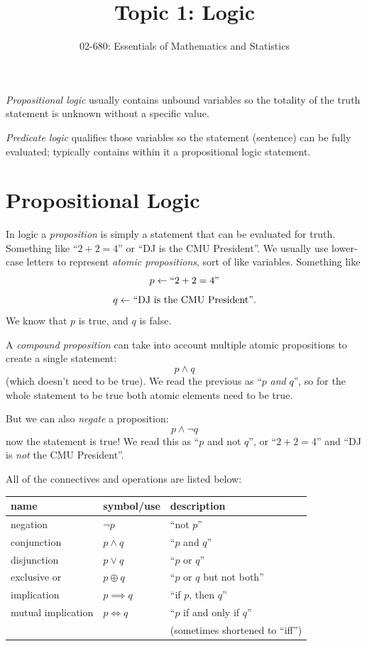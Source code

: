 


\title{Topic 1:  Logic}
\author{02-680: Essentials of Mathematics and Statistics}


\maketitle

\emph{Propositional logic} usually contains unbound variables so the totality of the truth statement is unknown without a specific value. 

\emph{Predicate logic} qualifies those variables so the statement (sentence) can be fully evaluated; typically contains within it a propositional logic statement. 

\section{Propositional Logic}
In logic a \emph{proposition} is simply a statement that can be evaluated for truth. 
Something like ``$2+2=4$'' or ``DJ is the CMU President''. 
We usually use lower-case letters to represent \emph{atomic propositions}, sort of like variables. 
Something like 
\[ p \leftarrow \textnormal{``}2+2=4\textnormal{''}\]
\[ q \leftarrow \textnormal{``DJ is the CMU President''}.\]
We know that $p$ is true, and $q$ is false. 


A \emph{compound proposition} can take into account multiple atomic propositions to create a single statement: 
\[ p \wedge q \]
(which doesn't need to be true). 
We read the previous as ``$p$ \textit{and} $q$'', 
so for the whole statement to be true both atomic elements need to be true. 
 
But we can also \textit{negate} a proposition: 
\[ p \wedge \neg q \]
now the statement is true! 
We read this as ``$p$ and not $q$'', 
or  ``$2+2=4$'' and  ``DJ is \emph{not} the CMU President''.

All of the connectives and operations are listed below: 
\begin{table}
\centering
\begin{tabular}{lll}
name 		& symbol/use 		& description\\
\hline 
\hline
negation			& $\neg p$		& ``not $p$''\\
\hline
conjunction		& $p \wedge q$		& ``$p$ and $q$''\\
disjunction		& $p \vee q$		& ``$p$ or $q$''\\
exclusive or		& $p \oplus q$		& ``$p$ or $q$ but not both''\\
\hline
implication		& $p \implies q$	& ``if $p$, then $q$''\\
mutual implication 	& $p \iff q$		& ``$p$ if and only if $q$'' \\
				&				& \hspace{3em}(sometimes shortened to ``iff'')\\
\hline
\end{tabular}
\end{table}


